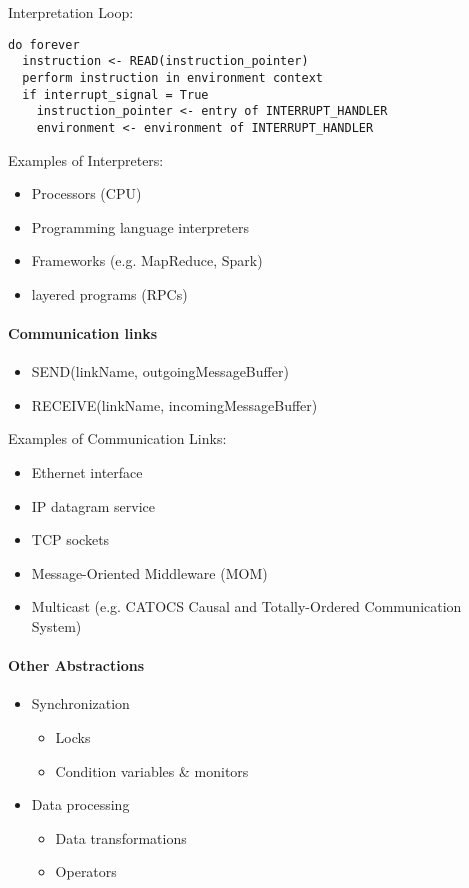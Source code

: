 Interpretation Loop:

\begin{lstlisting}
do forever
  instruction <- READ(instruction_pointer)
  perform instruction in environment context
  if interrupt_signal = True
    instruction_pointer <- entry of INTERRUPT_HANDLER
    environment <- environment of INTERRUPT_HANDLER
\end{lstlisting}

Examples of Interpreters:
\begin{itemize}
\item Processors (CPU)
\item Programming language interpreters
\item Frameworks (e.g. MapReduce, Spark)
\item layered programs (RPCs)
\end{itemize}

\paragraph{Communication links}
\begin{itemize}
\item SEND(linkName, outgoingMessageBuffer)
\item RECEIVE(linkName, incomingMessageBuffer)
\end{itemize}

Examples of Communication Links:
\begin{itemize}
\item Ethernet interface
\item IP datagram service
\item TCP sockets
\item Message-Oriented Middleware (MOM)
\item Multicast (e.g. CATOCS Causal and Totally-Ordered
  Communication System)
\end{itemize}

\paragraph{Other Abstractions}
\begin{itemize}
\item Synchronization
  \begin{itemize}
  \item Locks
  \item Condition variables \& monitors
  \end{itemize}
\item Data processing
  \begin{itemize}
  \item Data transformations
  \item Operators
  \end{itemize}
\end{itemize}

